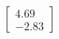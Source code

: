 \documentclass[preview]{standalone}
\begin{document}
\begin{align*}
\begin{bmatrix} 4.69 \\ -2.83 \end{bmatrix}
\end{align*}
\end{document}
